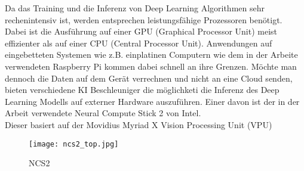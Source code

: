 Da das Training und die Inferenz von Deep Learning Algorithmen
 sehr rechenintensiv ist, werden entsprechen leistungsfähige 
Prozessoren benötigt. Dabei ist die Ausführung auf einer GPU 
(Graphical Processor Unit) meist effizienter als auf einer 
CPU (Central Processor Unit). Anwendungen auf eingebetteten Systemen
wie z.B. einplatinen Computern wie dem in der Arbeite verwendeten
Raspberry Pi kommen dabei schnell an ihre Grenzen.
Möchte man dennoch die Daten auf dem Gerät verrechnen und 
nicht an eine Cloud senden, bieten verschiedene KI Beschleuniger 
die möglichketi die Inferenz des Deep Learning Modells 
auf externer Hardware auszuführen. Einer davon ist der in der 
Arbeit verwendete Neural Compute Stick 2 von Intel.
\\
Dieser basiert auf der Movidius Myriad X Vision Processing Unit (VPU)
\cite{haussermannFunktionUndEffizienz}

\begin{figure}[htb]
    \centering
    \label{fig:ncs2}
    \texttt{[image: ncs2\_top.jpg]}
    \caption{NCS2}
\end{figure}


